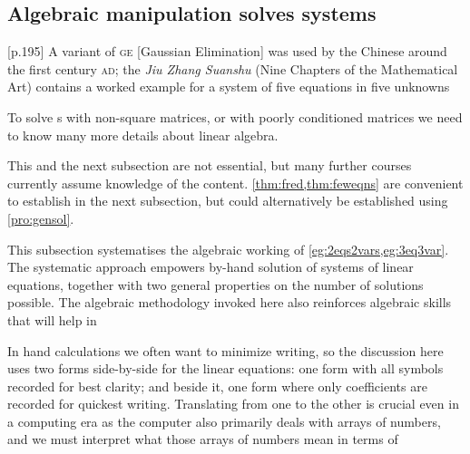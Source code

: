 







\subsection{Algebraic manipulation solves systems}
\label{sec:amss}

\begin{quoted}{\cite{Higham1996} [p.195]}
A variant of \textsc{ge} [Gaussian Elimination] was used by the Chinese around the first century \textsc{ad}; the \emph{Jiu Zhang Suanshu} (Nine Chapters of the Mathematical Art) contains a worked example for a system of five equations in five unknowns
\end{quoted}

To solve s with non-square matrices, or with poorly conditioned matrices we need to know many more details about linear algebra.

\begin{aside}
This and the next subsection are not essential, but many further courses currently assume knowledge of the content. 
\cref{thm:fred,thm:feweqns} are convenient to establish in the next subsection, but could alternatively be established using \cref{pro:gensol}. 
\end{aside}
This subsection systematises the algebraic working of \cref{eg:2eqs2vars,eg:3eq3var}.
The systematic approach empowers by-hand solution of systems of linear equations, together with two general properties on the number of solutions possible.
The algebraic methodology invoked here also reinforces algebraic skills that will help in 

In hand calculations we often want to minimize writing, so the discussion here uses two forms side-by-side for the linear equations: one form with all symbols recorded for best clarity; and beside it, one form where only coefficients are recorded for quickest writing.
Translating from one to the other is crucial even in a computing era as the computer also primarily deals with arrays of numbers, and we must interpret what those arrays of numbers mean in terms of 


